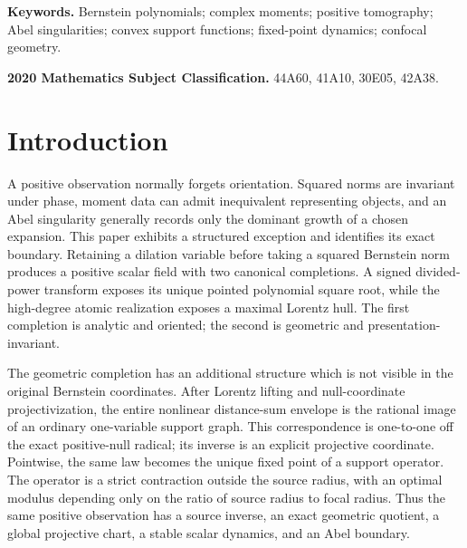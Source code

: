 \documentclass[11pt]{article}
\theoremstyle{remark}
\begin{document}
\begin{abstract}
Thus the common moments split the entire admissible presentation fibre into an intrinsic
radical/transverse alternative and determine the complete confocal upper field, its maximal hull,
its half-order coefficient, and every singleton exposed conjugation orbit.  Quantitatively,
\[
 0\le R(B(R)^2-1)-2\Delta
 \le \frac{M^2}{R-M}+\frac{4M^2}{R},
\]
and both the amplitude and Abel-radius recessions converge to $2\Delta$.  This analytic root,
maximal geometric hull, projective dynamics, and Abel spectrum constitute one bicompletion law,
not four independent reconstructions.
\end{abstract}

\noindent\textbf{Keywords.} Bernstein polynomials; complex moments; positive tomography;
Abel singularities; convex support functions; fixed-point dynamics; confocal geometry.

\medskip
\noindent\textbf{2020 Mathematics Subject Classification.} 44A60, 41A10, 30E05, 42A38.

\section{Introduction}

A positive observation normally forgets orientation.  Squared norms are invariant under phase,
moment data can admit inequivalent representing objects, and an Abel singularity generally
records only the dominant growth of a chosen expansion.  This paper exhibits a structured
exception and identifies its exact boundary.  Retaining a dilation variable before taking a
squared Bernstein norm produces a positive scalar field with two canonical completions.  A
signed divided-power transform exposes its unique pointed polynomial square root, while the
high-degree atomic realization exposes a maximal Lorentz hull.  The first completion is analytic
and oriented; the second is geometric and presentation-invariant.

The geometric completion has an additional structure which is not visible in the original
Bernstein coordinates.  After Lorentz lifting and null-coordinate projectivization, the entire
nonlinear distance-sum envelope is the rational image of an ordinary one-variable support graph.
This correspondence is one-to-one off the exact positive-null radical; its inverse is an explicit
projective coordinate.  Pointwise, the same law becomes the unique fixed point of a support
operator.  The operator is a strict contraction outside the source radius, with an optimal modulus
depending only on the ratio of source radius to focal radius.  Thus the same positive observation
has a source inverse, an exact geometric quotient, a global projective chart, a stable scalar
dynamics, and an Abel boundary.
\end{document}
